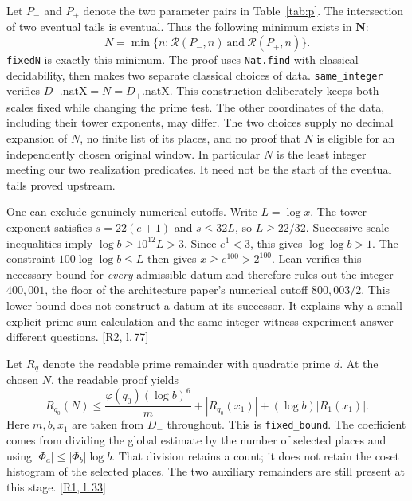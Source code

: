 \documentclass[12pt,letterpaper]{article}
\newcommand{\id}[1]{{\small\nolinkurl{#1}}}
\begin{document}
Let $P_-$ and $P_+$ denote the two parameter pairs in Table~\ref{tab:p}. The intersection of two eventual tails is eventual. Thus the following minimum exists in $\mathbf N$:
\[
 N=\min\{n:\mathcal R(P_-,n)\ \text{and}\ \mathcal R(P_+,n)\}.
\]
\id{fixedN} is exactly this minimum. The proof uses \id{Nat.find} with classical decidability, then makes two separate classical choices of data. \id{same_integer} verifies $D_-.\mathrm{natX}=N=D_+.\mathrm{natX}$. This construction deliberately keeps both scales fixed while changing the prime test. The other coordinates of the data, including their tower exponents, may differ. The two choices supply no decimal expansion of $N$, no finite list of its places, and no proof that $N$ is eligible for an independently chosen original window. In particular $N$ is the least integer meeting our two realization predicates. It need not be the start of the eventual tails proved upstream.

One can exclude genuinely numerical cutoffs. Write $L=\log x$. The tower exponent satisfies $s=22(e+1)$ and $s\le32L$, so $L\ge22/32$. Successive scale inequalities imply $\log b\ge10^{12}L>3$. Since $e^1<3$, this gives $\log\log b>1$. The constraint $100\log\log b\le L$ then gives $x\ge e^{100}>2^{100}$. Lean verifies this necessary bound for \emph{every} admissible datum and therefore rules out the integer $400{,}001$, the floor of the architecture paper’s numerical cutoff $800{,}003/2$. This lower bound does not construct a datum at its successor. It explains why a small explicit prime-sum calculation and the same-integer witness experiment answer different questions. {\footnotesize\sffamily\color{mute}[\href{https://github.com/leanprover-community/riemann-hypothesis/blob/e063a923620ee7787b4a1270421478645bf66bdb/src/New/Reduction/Data/AdmissibleData.lean\#L77}{R2, l.\,77}]}

Let $R_q$ denote the readable prime remainder with quadratic prime $d$. At the chosen $N$, the readable proof yields
\[
 R_{q_0}(N)\leq \frac{\varphi(q_0)(\log b)^6}{m}
       +|R_{q_0}(x_1)|+(\log b)|R_1(x_1)|.
\]
Here $m,b,x_1$ are taken from $D_-$ throughout. This is \id{fixed_bound}. The coefficient comes from dividing the global estimate by the number of selected places and using $|\Phi_a|\leq |\Phi_b|\log b$. That division retains a count; it does not retain the coset histogram of the selected places. The two auxiliary remainders are still present at this stage. {\footnotesize\sffamily\color{mute}[\href{https://github.com/leanprover-community/riemann-hypothesis/blob/e063a923620ee7787b4a1270421478645bf66bdb/src/New/Reduction/OneSidedBound.lean\#L33}{R1, l.\,33}]}
\end{document}
